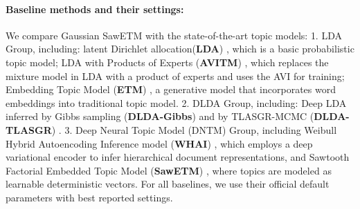 \documentclass{article}
\begin{document}


\paragraph{Baseline methods and their settings:} We compare Gaussian SawETM with the state-of-the-art topic models: {1. LDA Group}, including: latent Dirichlet allocation(\textbf{LDA}) \cite{blei2003latent}, which is a basic probabilistic topic model; LDA with Products of Experts (\textbf{AVITM})  \cite{srivastava2017autoencoding}, which replaces the mixture model in LDA with a product of experts and uses the AVI for training; Embedding Topic Model (\textbf{ETM}) \cite{dieng2020topic}, a generative model that incorporates word embeddings into traditional topic model. 
{2. DLDA Group}, including: Deep LDA inferred by Gibbs sampling (\textbf{DLDA-Gibbs}) \cite{zhou2015poisson}  and  by TLASGR-MCMC (\textbf{DLDA-TLASGR}) \cite{cong2017deep}. {3. Deep Neural Topic Model (DNTM) Group}, including Weibull Hybrid Autoencoding Inference model (\textbf{WHAI}) \citep{zhang2018whai}, which employs a deep variational encoder to infer hierarchical document representations, and Sawtooth Factorial Embedded Topic Model (\textbf{SawETM}) \citep{duan2021sawtooth}, where topics are modeled as learnable deterministic vectors. For all baselines, we use their official default parameters with best reported settings. 
\end{document}
